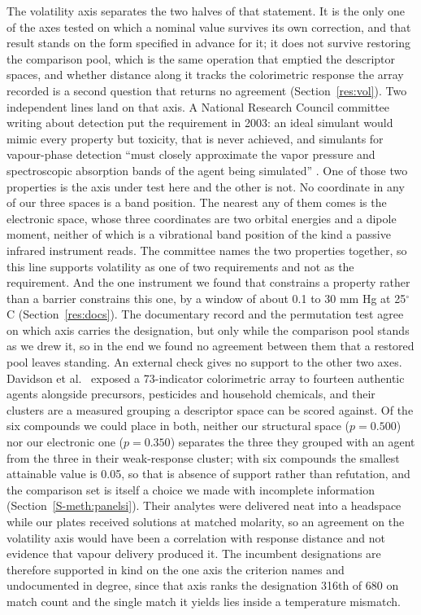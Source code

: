 \documentclass[journal=ancham,manuscript=article,margin=1in]{achemso}
\begin{document}
The volatility axis separates the two halves of that statement. It is the only
one of the axes tested on which a nominal value survives its own correction,
and that result stands on the form specified in advance for it; it does not
survive restoring the comparison pool, which is the same operation that emptied
the descriptor spaces, and whether distance along it tracks the colorimetric
response the array recorded is a second question that returns no agreement
(Section~\ref{res:vol}). Two independent lines land on that axis. A National Research Council
committee writing about detection put the requirement in 2003: an ideal simulant
would mimic every property but toxicity, that is never achieved, and simulants
for vapour-phase detection ``must closely approximate the vapor pressure and
spectroscopic absorption bands of the agent being simulated''
\cite{nrc2003standoff}. One of those two properties is the axis under test
here and the other is not. No coordinate in any of our three spaces is a band
position. The nearest any of them comes is the electronic space, whose three
coordinates are two orbital energies and a dipole moment, neither of which is a
vibrational band position of the kind a passive infrared instrument reads. The
committee names the two properties together, so this line supports volatility
as one of two requirements and not as the requirement. And the one instrument we found that constrains a
property rather than a barrier constrains this one, by a window of about 0.1 to
30 mm Hg at 25$^{\circ}$C (Section~\ref{res:docs}). The documentary record and
the permutation test agree on which axis carries the designation, but only
while the comparison pool stands as we drew it, so in the end we found no
agreement between them that a restored pool leaves standing. An external check gives no support to the other two
axes. Davidson et al.~\cite{davidson2020} exposed a 73-indicator colorimetric
array to fourteen authentic agents alongside precursors, pesticides and
household chemicals, and their clusters are a measured grouping a descriptor
space can be scored against. Of the six compounds we could place in both,
neither our structural space ($p = 0.500$) nor our electronic one ($p = 0.350$)
separates the three they grouped with an agent from the three in their
weak-response cluster; with six compounds the smallest attainable value is 0.05,
so that is absence of support rather than refutation, and the comparison set is
itself a choice we made with incomplete information
(Section~\ref{S-meth:panelsi}). Their analytes were delivered neat into a
headspace while our plates received solutions at matched molarity, so an
agreement on the volatility axis would have been a correlation with response
distance and not evidence that vapour delivery produced it. The incumbent
designations are therefore supported in kind on the one axis the criterion names
and undocumented in degree, since that axis ranks the designation 316th of 680
on match count and the single match it yields lies inside a temperature
mismatch.
\end{document}
